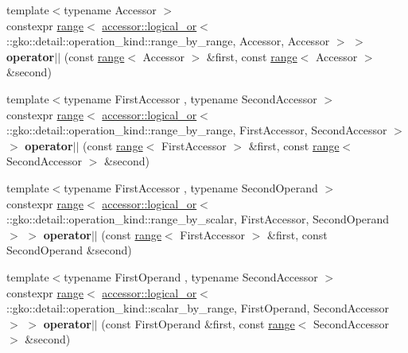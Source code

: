 \begin{DoxyCompactItemize}
\item 
\mbox{\label{namespacegko_a5409d98fe2fc4ae364dab8e6a76d4016}} 
{\footnotesize template$<$typename Accessor $>$ }\\constexpr \hyperlink{classgko_1_1range}{range}$<$ \hyperlink{structgko_1_1accessor_1_1logical__or}{accessor\+::logical\+\_\+or}$<$ \+::gko\+::detail\+::operation\+\_\+kind\+::range\+\_\+by\+\_\+range, Accessor, Accessor $>$ $>$ {\bfseries operator$\vert$$\vert$} (const \hyperlink{classgko_1_1range}{range}$<$ Accessor $>$ \&first, const \hyperlink{classgko_1_1range}{range}$<$ Accessor $>$ \&second)
\item 
\mbox{\label{namespacegko_a90d30de07b0c483d6c25cd9ac7f27487}} 
{\footnotesize template$<$typename First\+Accessor , typename Second\+Accessor $>$ }\\constexpr \hyperlink{classgko_1_1range}{range}$<$ \hyperlink{structgko_1_1accessor_1_1logical__or}{accessor\+::logical\+\_\+or}$<$ \+::gko\+::detail\+::operation\+\_\+kind\+::range\+\_\+by\+\_\+range, First\+Accessor, Second\+Accessor $>$ $>$ {\bfseries operator$\vert$$\vert$} (const \hyperlink{classgko_1_1range}{range}$<$ First\+Accessor $>$ \&first, const \hyperlink{classgko_1_1range}{range}$<$ Second\+Accessor $>$ \&second)
\item 
\mbox{\label{namespacegko_ad2e2f0c77efabd6d47e3dbb4b2a8270b}} 
{\footnotesize template$<$typename First\+Accessor , typename Second\+Operand $>$ }\\constexpr \hyperlink{classgko_1_1range}{range}$<$ \hyperlink{structgko_1_1accessor_1_1logical__or}{accessor\+::logical\+\_\+or}$<$ \+::gko\+::detail\+::operation\+\_\+kind\+::range\+\_\+by\+\_\+scalar, First\+Accessor, Second\+Operand $>$ $>$ {\bfseries operator$\vert$$\vert$} (const \hyperlink{classgko_1_1range}{range}$<$ First\+Accessor $>$ \&first, const Second\+Operand \&second)
\item 
\mbox{\label{namespacegko_aa475e217d2a6cec2e7be2b5b67c1f411}} 
{\footnotesize template$<$typename First\+Operand , typename Second\+Accessor $>$ }\\constexpr \hyperlink{classgko_1_1range}{range}$<$ \hyperlink{structgko_1_1accessor_1_1logical__or}{accessor\+::logical\+\_\+or}$<$ \+::gko\+::detail\+::operation\+\_\+kind\+::scalar\+\_\+by\+\_\+range, First\+Operand, Second\+Accessor $>$ $>$ {\bfseries operator$\vert$$\vert$} (const First\+Operand \&first, const \hyperlink{classgko_1_1range}{range}$<$ Second\+Accessor $>$ \&second)

\end{DoxyCompactItemize}
